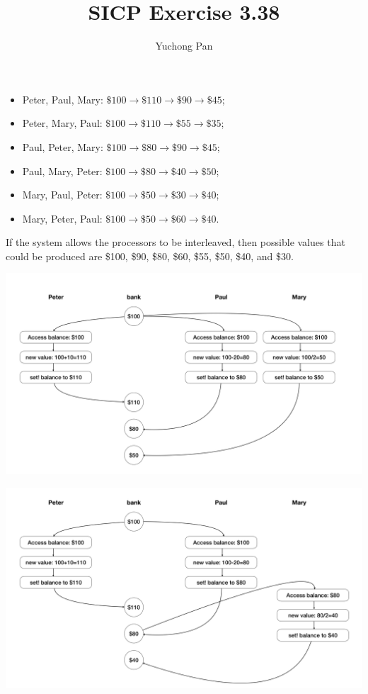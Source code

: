 \documentclass[11pt, oneside]{article}
\title{SICP Exercise 3.38}
\author{Yuchong Pan}
\begin{document}
\maketitle

\begin{itemize}
    \item Peter, Paul, Mary: $\$100\rightarrow\$110\rightarrow\$90\rightarrow\$45$;
    \item Peter, Mary, Paul: $\$100\rightarrow\$110\rightarrow\$55\rightarrow\$35$;
    \item Paul, Peter, Mary: $\$100\rightarrow\$80\rightarrow\$90\rightarrow\$45$;
    \item Paul, Mary, Peter: $\$100\rightarrow\$80\rightarrow\$40\rightarrow\$50$;
    \item Mary, Paul, Peter: $\$100\rightarrow\$50\rightarrow\$30\rightarrow\$40$;
    \item Mary, Peter, Paul: $\$100\rightarrow\$50\rightarrow\$60\rightarrow\$40$.
\end{itemize}

\medskip

 If the system allows the processors to be interleaved, then possible values that could be produced are \$100, \$90, \$80, \$60, \$55, \$50, \$40, and \$30.

\begin{center}
    \includegraphics[width=.8\textwidth,height=.8\textheight,keepaspectratio]{1.png}
\end{center}

\begin{center}
    \includegraphics[width=.8\textwidth,height=.8\textheight,keepaspectratio]{2.png}
\end{center}
\end{document}
